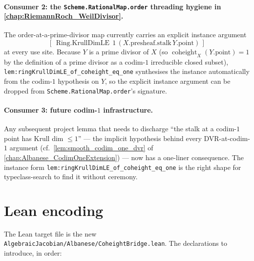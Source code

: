 \paragraph{Consumer 2: the \texttt{Scheme.RationalMap.order} threading
hygiene in \texorpdfstring{\cref{chap:RiemannRoch_WeilDivisor}}{the Weil-divisor chapter}.}
The order-at-a-prime-divisor map currently carries an explicit instance
argument
\[
  [\,\operatorname{Ring.KrullDimLE}\,1\,(X.\text{presheaf.stalk}\,Y.\text{point})\,]
\]
at every use site. Because \(Y\) is a prime divisor of \(X\) (so
\(\operatorname{coheight}_{X}(Y.\text{point}) = 1\) by the definition of a prime
divisor as a codim-\(1\) irreducible closed subset),
\texttt{lem:ringKrullDimLE_of_coheight_eq_one} synthesises the instance
automatically from the codim-\(1\) hypothesis on \(Y\), so the explicit instance
argument can be dropped from \texttt{Scheme.RationalMap.order}'s signature.

\paragraph{Consumer 3: future codim-\(1\) infrastructure.} Any subsequent
project lemma that needs to discharge ``the stalk at a codim-\(1\) point has
Krull dim \(\leq 1\)'' --- the implicit hypothesis behind every DVR-at-codim-\(1\)
argument (cf.\ \cref{lem:smooth_codim_one_dvr} of
\cref{chap:Albanese_CodimOneExtension}) --- now has a one-liner consequence.
The instance form
\texttt{lem:ringKrullDimLE_of_coheight_eq_one} is the right shape for
typeclass-search to find it without ceremony.

\section{Lean encoding}
\label{sec:coheight_lean_encoding}

The Lean target file is the new
\texttt{AlgebraicJacobian/Albanese/CoheightBridge.lean}. The declarations to
introduce, in order:

